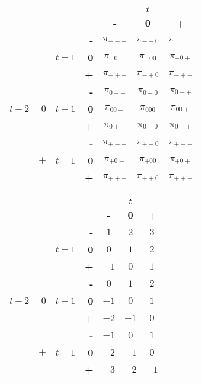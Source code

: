 \documentclass{article}[]
\begin{document}
\begin{center}
\begin{tabular}{r | r | r | r | c c c | }
 \multicolumn{3}{r}{} & \multicolumn{1}{r}{} &	\multicolumn{3}{c}{$t$} \\ \cline{5-7}
 \multicolumn{3}{r}{} & 		& \textbf{-} & \textbf{0} & \textbf{+} \\ \cline{2-2} \cline{4-7}
&     &		&    \textbf{-} & $\pi_{---}$	& $\pi_{--0}$	& $\pi_{--+}$ \\ 
&  $-$ &$t-1$ & \textbf{0} & $\pi_{-0-}$	& $\pi_{-00}$	& $\pi_{-0+}$	\\
     &   &		&    \textbf{+} & $\pi_{-+-}$	& $\pi_{-+0}$	& $\pi_{-++}$ \\ \cline{2-2} \cline{4-7}
     &   &		&    \textbf{-} & $\pi_{0--}$	& $\pi_{0-0}$	& $\pi_{0-+}$ \\ 
$t-2$ & $0$   &$t-1$ & \textbf{0} & $\pi_{00-}$	& $\pi_{000}$	& $\pi_{00+}$	\\
     &   &		&    \textbf{+} & $\pi_{0+-}$	& $\pi_{0+0}$	& $\pi_{0++}$ \\ \cline{2-2} \cline{4-7}
     &   &		&    \textbf{-} & $\pi_{+--}$	& $\pi_{+-0}$	& $\pi_{+-+}$ \\ 
&$+$   &$t-1$ & \textbf{0} & $\pi_{+0-}$	& $\pi_{+00}$	& $\pi_{+0+}$	\\
     &   &		&    \textbf{+} & $\pi_{++-}$	& $\pi_{++0}$	& $\pi_{+++}$ \\ \cline{2-2} \cline{4-7}
		
\end{tabular}    
\end{center}

\begin{center}
\begin{tabular}{r | r | r | r | c c c | }
 \multicolumn{3}{r}{} & \multicolumn{1}{r}{} &	\multicolumn{3}{c}{$t$} \\ \cline{5-7}
 \multicolumn{3}{r}{} & 		& \textbf{-} & \textbf{0} & \textbf{+} \\ \cline{2-2} \cline{4-7}
&     &		&    \textbf{-} & $1$	& $2$	& $3$ \\ 
&  $-$ &$t-1$ & \textbf{0} & $0$	& $1$	& $2$	\\
     &   &		&    \textbf{+} & $-1$	& $0$	& $1$ \\ \cline{2-2} \cline{4-7}

     &   &		&    \textbf{-} & $0$	& $1$	& $2$ \\ 
$t-2$ & $0$   &$t-1$ & \textbf{0} & $-1$	& $0$	& $1$	\\
     &   &		&    \textbf{+} & $-2$	& $-1$	& $0$ \\ \cline{2-2} \cline{4-7}

     &   &		&    \textbf{-} & $-1$	& $0$	& $1$ \\ 
&$+$   &$t-1$ & \textbf{0} & $-2$	& $-1$	& $0$	\\
     &   &		&    \textbf{+} & $-3$	& $-2$	& $-1$ \\ \cline{2-2} \cline{4-7}
		
\end{tabular}    
\end{center}
\end{document}

